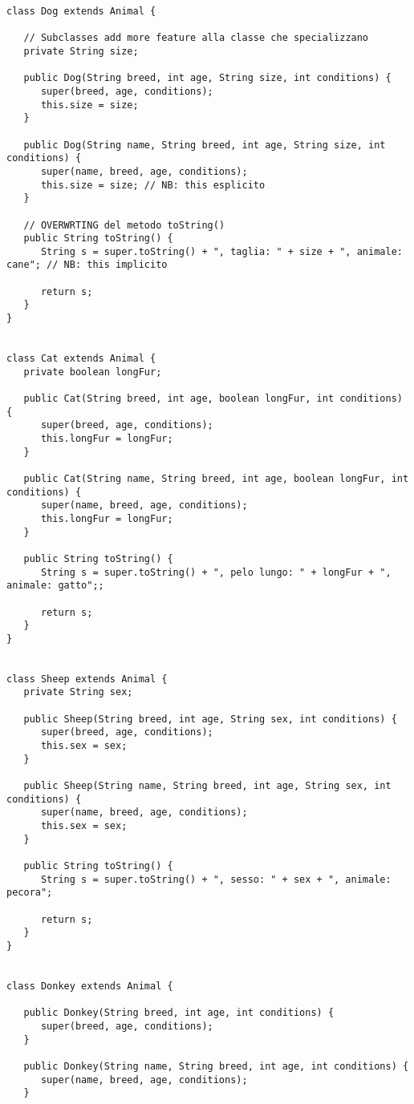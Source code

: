 \documentclass{article}
\begin{document}
\begin{lstlisting}[caption={Animal.java}]
class Dog extends Animal {

   // Subclasses add more feature alla classe che specializzano
   private String size;

   public Dog(String breed, int age, String size, int conditions) {
      super(breed, age, conditions);
      this.size = size;
   }

   public Dog(String name, String breed, int age, String size, int conditions) {
      super(name, breed, age, conditions);
      this.size = size; // NB: this esplicito
   }

   // OVERWRTING del metodo toString()
   public String toString() {
      String s = super.toString() + ", taglia: " + size + ", animale: cane"; // NB: this implicito

      return s;
   }
}


class Cat extends Animal {
   private boolean longFur;

   public Cat(String breed, int age, boolean longFur, int conditions) {
      super(breed, age, conditions);
      this.longFur = longFur;
   }

   public Cat(String name, String breed, int age, boolean longFur, int conditions) {
      super(name, breed, age, conditions);
      this.longFur = longFur;
   }

   public String toString() {
      String s = super.toString() + ", pelo lungo: " + longFur + ", animale: gatto";;

      return s;
   }
}


class Sheep extends Animal {
   private String sex;

   public Sheep(String breed, int age, String sex, int conditions) {
      super(breed, age, conditions);
      this.sex = sex;
   }

   public Sheep(String name, String breed, int age, String sex, int conditions) {
      super(name, breed, age, conditions);
      this.sex = sex;
   }

   public String toString() {
      String s = super.toString() + ", sesso: " + sex + ", animale: pecora";

      return s;
   }
}


class Donkey extends Animal {

   public Donkey(String breed, int age, int conditions) {
      super(breed, age, conditions);
   }

   public Donkey(String name, String breed, int age, int conditions) {
      super(name, breed, age, conditions);
   }


\end{lstlisting}
\end{document}
